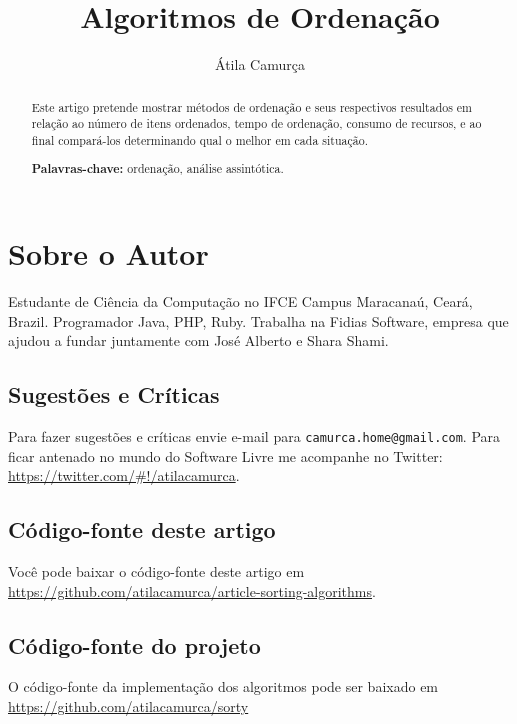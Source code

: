 \documentclass[a4paper,12pt]{article}
\title{Algoritmos de Ordenação}
\author{Átila Camurça}
\begin{document}
\maketitle

\begin{abstract}
Este artigo pretende mostrar métodos de ordenação e seus respectivos
resultados em relação ao número de itens ordenados, tempo de ordenação,
consumo de recursos, e ao final compará-los determinando qual o melhor em cada
situação.

\smallskip
\noindent \textbf{Palavras-chave:} ordenação, análise assintótica.

\end{abstract}

\newpage

\tableofcontents



\appendix

\section{Sobre o Autor}

Estudante de Ciência da Computação no IFCE Campus Maracanaú, Ceará, Brazil. Programador Java,
PHP, Ruby. Trabalha na Fidias Software, empresa que ajudou a fundar juntamente com José Alberto
e Shara Shami.

\subsection*{Sugestões e Críticas}

Para fazer sugestões e críticas envie e-mail para \texttt{camurca.home@gmail.com}. Para ficar antenado
no mundo do Software Livre me acompanhe no Twitter:\\ \url{https://twitter.com/#!/atilacamurca}.

\subsection*{Código-fonte deste artigo}

Você pode baixar o código-fonte deste artigo em\\ \url{https://github.com/atilacamurca/article-sorting-algorithms}.

\subsection*{Código-fonte do projeto}

O código-fonte da implementação dos algoritmos pode ser baixado em\\ \url{https://github.com/atilacamurca/sorty}

\nocite{harris}
\nocite{santos}
\nocite{hshah}
\nocite{lydia}
\nocite{rosetta-counting}
\nocite{fong}
\nocite{robson}
\nocite{algolist-selection}
\nocite{unicamp-insertion}
\nocite{rmuhamma}


\end{document}

